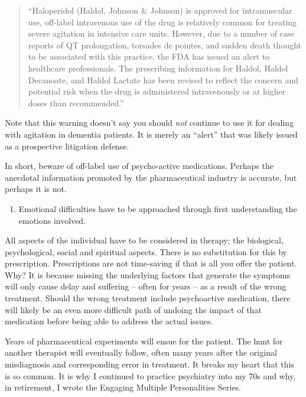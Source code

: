 \documentclass[]{book}
\providecommand{\tightlist}{%
  \setlength{\itemsep}{0pt}\setlength{\parskip}{0pt}}
\begin{document}
\begin{quote}
``Haloperidol (Haldol, Johnson \& Johnson) is approved for intramuscular use, off-label intravenous use of the drug is relatively common for treating severe agitation in intensive care units. However, due to a number of case reports of QT prolongation, torsades de pointes, and sudden death thought to be associated with this practice, the FDA has issued an alert to healthcare professionals. The prescribing information for Haldol, Haldol Decanoate, and Haldol Lactate has been revised to reflect the concern and potential risk when the drug is administered intravenously or at higher doses than recommended.''
\end{quote}

Note that this warning doesn't say you should \emph{not} continue to use it for dealing with agitation in dementia patients. It is merely an ``alert'' that was likely issued as a prospective litigation defense.

In short, beware of off-label use of psycho-active medications. Perhaps the anecdotal information promoted by the pharmaceutical industry is accurate, but perhaps it is not.

\begin{enumerate}
\def\labelenumi{\arabic{enumi}.}
\setcounter{enumi}{8}
\tightlist
\item
  Emotional difficulties have to be approached through first understanding the emotions involved.
\end{enumerate}

All aspects of the individual have to be considered in therapy; the biological, psychological, social and spiritual aspects. There is no substitution for this by prescription. Prescriptions are not time-saving if that is all you offer the patient. Why? It is because missing the underlying factors that generate the symptoms will only cause delay and suffering -- often for years -- as a result of the wrong treatment. Should the wrong treatment include psychoactive medication, there will likely be an even more difficult path of undoing the impact of that medication before being able to address the actual issues.

Years of pharmaceutical experiments will ensue for the patient. The hunt for another therapist will eventually follow, often many years after the original misdiagnosis and corresponding error in treatment. It breaks my heart that this is so common. It is why I continued to practice psychiatry into my 70s and why, in retirement, I wrote the Engaging Multiple Personalities Series.
\end{document}
